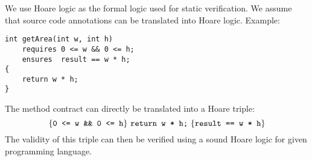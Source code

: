 We use Hoare logic \cite{hoare1969axiomatic} as the formal logic used for static verification.
We assume that source code annotations can be translated into Hoare logic.
Example:
\begin{lstlisting}
int getArea(int w, int h)
    requires 0 <= w && 0 <= h;
    ensures  result == w * h;
{
    return w * h;
}
\end{lstlisting}
The method contract can directly be translated into a Hoare triple:
\begin{displaymath}
\{{\texttt{0 <= w \&\& 0 <= h}}\} ~{\texttt{return w * h;}}~ \{{\texttt{result == w * h}}\}
\end{displaymath}
The validity of this triple can then be verified using a sound Hoare logic for given programming language.